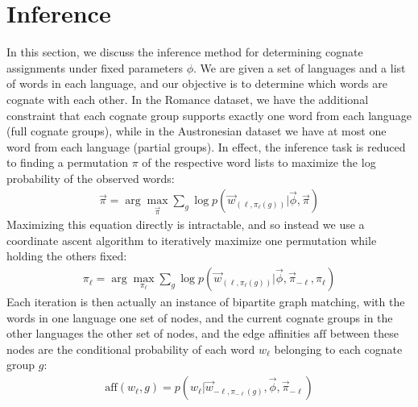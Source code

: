 \documentclass[11pt,a4paper]{article}
\begin{document}
\section{Inference}
In this section, we discuss the inference method for determining
cognate assignments under fixed parameters $\phi$.  We are given a
set of languages and a list of words in each language, and our
objective is to determine which words are cognate with each other.
In the Romance dataset, we have the additional constraint that each
cognate group supports exactly one word from each language (full
cognate groups), while in the Austronesian dataset we have
at most one word from each language (partial groups). In effect,
the inference task is reduced to finding a permutation $\pi$ of the
respective word lists to maximize the log probability of the observed
words:
\begin{equation}
  \begin{split}
    \vec{\pi} = \arg\!\max_{\vec \pi} \sum_{g} \log p(\vec w_{(\ell,\pi_\ell(g))}|\vec \phi,\vec \pi)
   \end{split}
 \end{equation}
Maximizing this equation directly is intractable, and so instead
we use a coordinate ascent algorithm to iteratively maximize one
permutation while holding the others fixed:
\begin{equation}
  \begin{split}
    \pi_\ell = \arg\!\max_{\pi_\ell} \sum_{g} \log p(\vec w_{(\ell,\pi_\ell(g))}|\vec \phi,\vec \pi_{-\ell},\pi_\ell)
  \end{split}
\end{equation}
Each iteration is then actually an instance of bipartite graph
matching, with the words in one language one set of nodes, and the
current cognate groups in the other languages the other set of
nodes, and the edge affinities $\mathrm{aff}$ between these nodes are the conditional
probability of each word $w_\ell$ belonging to each cognate group $g$:
\begin{equation}
  \begin{split}
    \mathrm{aff}(w_\ell,g) = p(w_\ell|\vec w_{-\ell,\pi_{-\ell}(g)},\vec \phi,\vec\pi_{-\ell})
   \end{split}
 \end{equation}
\end{document}
